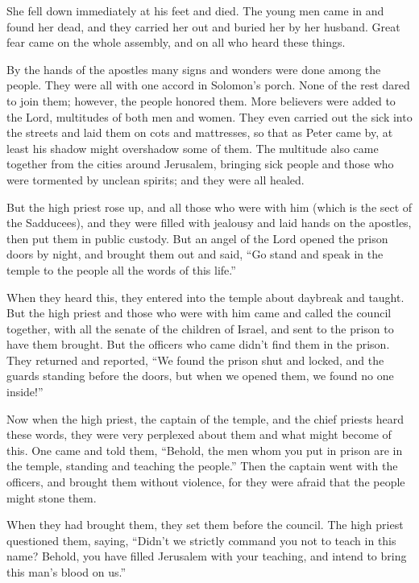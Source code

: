  She fell down immediately at his feet and died. The young
men came in and found her dead, and they carried her out and buried her
by her husband.  Great fear came on the whole assembly, and
on all who heard these things.

 By the hands of the apostles many signs and wonders were
done among the people. They were all with one accord in Solomon's porch.
 None of the rest dared to join them; however, the people
honored them.  More believers were added to the Lord,
multitudes of both men and women.  They even carried out
the sick into the streets and laid them on cots and mattresses, so that
as Peter came by, at least his shadow might overshadow some of them.
 The multitude also came together from the cities around
Jerusalem, bringing sick people and those who were tormented by unclean
spirits; and they were all healed.

 But the high priest rose up, and all those who were with
him (which is the sect of the Sadducees), and they were filled with
jealousy  and laid hands on the apostles, then put them in
public custody.  But an angel of the Lord opened the prison
doors by night, and brought them out and said,  ``Go stand
and speak in the temple to the people all the words of this life.''

 When they heard this, they entered into the temple about
daybreak and taught. But the high priest and those who were with him
came and called the council together, with all the senate of the
children of Israel, and sent to the prison to have them brought.
 But the officers who came didn't find them in the prison.
They returned and reported,  ``We found the prison shut and
locked, and the guards standing before the doors, but when we opened
them, we found no one inside!''

 Now when the high priest, the captain of the temple, and
the chief priests heard these words, they were very perplexed about them
and what might become of this.  One came and told them,
``Behold, the men whom you put in prison are in the temple, standing and
teaching the people.''  Then the captain went with the
officers, and brought them without violence, for they were afraid that
the people might stone them.

 When they had brought them, they set them before the
council. The high priest questioned them,  saying, ``Didn't
we strictly command you not to teach in this name? Behold, you have
filled Jerusalem with your teaching, and intend to bring this man's
blood on us.''

